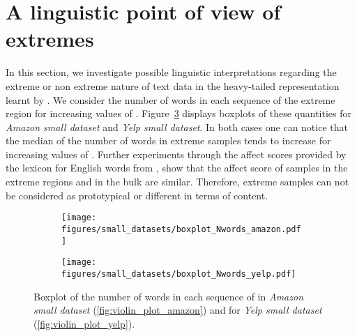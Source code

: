 \section{A linguistic point of view of extremes}\label{sec:linguistic_appendix}
In this section, we  investigate possible linguistic interpretations 
regarding the extreme or non extreme nature of text data in the heavy-tailed representation learnt by \HTalgo. 
We consider the number of words in each sequence of  the extreme region  for increasing values of .  Figure~\ref{fig:violin_plot} displays boxplots of these quantities for 
\textit{Amazon small dataset} and \textit{Yelp small dataset}. In both cases one can notice that the median  of the number of words in extreme samples tends to increase  for increasing values of . 
Further experiments through the affect scores provided by the lexicon for English words from \cite{mohammad2017word}, show that the affect score of samples in the extreme regions and in the bulk are similar. Therefore, extreme samples can not be considered as prototypical or different in terms of content.
\begin{figure}[ht]
\begin{subfigure}[t]{0.49\textwidth}
    \texttt{[image: figures/small\_datasets/boxplot\_Nwords\_amazon.pdf]}
    \caption{}
    \label{fig:violin_plot_amazon}
    \end{subfigure}
\begin{subfigure}[t]{0.49\textwidth}

    \texttt{[image: figures/small\_datasets/boxplot\_Nwords\_yelp.pdf]}
    \caption{}
    \label{fig:violin_plot_yelp}
\end{subfigure}
\caption{Boxplot of the number of words in each sequence of    in \textit{Amazon small dataset}  (\autoref{fig:violin_plot_amazon}) and for \textit{Yelp small dataset }  (\autoref{fig:violin_plot_yelp}). }
\label{fig:violin_plot}
\end{figure}
\fi
